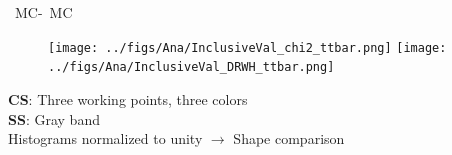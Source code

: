 \begin{frame}{\ttbar~MC-\ttbar~MC}
\vspace{-.2cm}
\begin{figure}[!Hhtbp]
  \begin{center}
    \texttt{[image: ../figs/Ana/InclusiveVal\_chi2\_ttbar.png]}
    \texttt{[image: ../figs/Ana/InclusiveVal\_DRWH\_ttbar.png]}
  \end{center}
\end{figure}

\vspace{-.2cm}
    \begin{block}{}\scriptsize
      \textbf{CS}: Three working points, three colors\\
      \textbf{SS}: Gray band\\
      Histograms normalized to unity $\to$ Shape comparison
    \end{block}

\end{frame}

